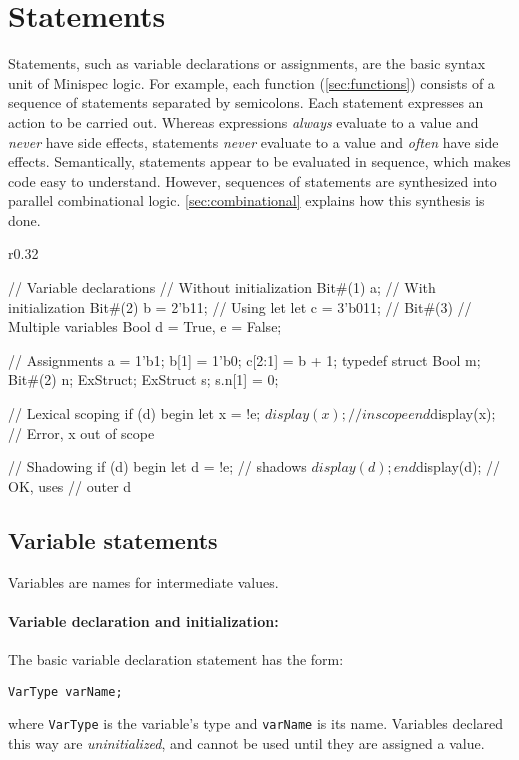 \section{Statements}
\label{sec:statements}

Statements, such as variable declarations or assignments, are the basic syntax unit of Minispec logic.
For example, each function (\autoref{sec:functions}) consists of a sequence of statements separated by semicolons.
Each statement expresses an action to be carried out.
Whereas expressions \emph{always} evaluate to a value and \emph{never} have side effects,
statements \emph{never} evaluate to a value and \emph{often} have side effects.
Semantically, statements appear to be evaluated in sequence, which makes code easy to understand.
However, sequences of statements are synthesized into parallel combinational logic.
\autoref{sec:combinational} explains how this synthesis is done.

\begin{wrapfigure}{r}{0.32\columnwidth}
\vspace{-3.5em}
\begin{mscode}
// Variable declarations
//  Without initialization
Bit#(1) a;
//  With initialization
Bit#(2) b = 2'b11;
//  Using let
let c = 3'b011; // Bit#(3)
//  Multiple variables
Bool d = True, e = False;

// Assignments
a = 1'b1;
b[1] = 1'b0;
c[2:1] = b + 1;
typedef struct {
  Bool m; Bit#(2) n;
} ExStruct;
ExStruct s;
s.n[1] = 0;

// Lexical scoping
if (d) begin
  let x = !e;
  $display(x); // in scope
end
$display(x);
// Error, x out of scope

// Shadowing
if (d) begin
   let d = !e; // shadows
   $display(d);
end
$display(d); // OK, uses
             // outer d
\end{mscode}
\vspace{-9.5em}
\end{wrapfigure}

\subsection{Variable statements}
\label{sec:varStmts}

Variables are names for intermediate values.

\paragraph{Variable declaration and initialization:} The basic variable declaration statement has the form:
\begin{center}
\verb|VarType varName;|
\end{center}
where \verb|VarType| is the variable's type and \verb|varName| is its name.
Variables declared this way are \emph{uninitialized}, and cannot be used until they are assigned a value.


